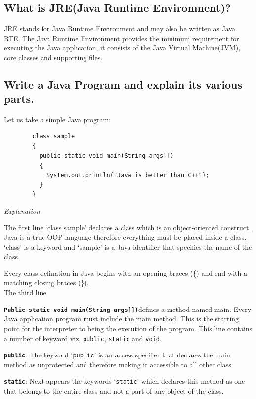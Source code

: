 \documentclass[11pt, a4paper]{book}
\begin{document}
    \subsection{What is JRE(Java Runtime Environment)?}
      JRE stands for Java Runtime Environment and may also be written as Java RTE. The Java Runtime Environment provides the minimum requirement for executing the Java application, it consists of the Java Virtual Machine(JVM), core classes and supporting files.
    
    
    \subsection{Write a Java Program and explain its various parts.}
      Let us take a simple Java program:
    
      \begin{lstlisting}
        class sample
        {
          public static void main(String args[])
          {
            System.out.println("Java is better than C++");
          }
        }
      \end{lstlisting}
      \textit{Explanation}
  
      The first line `class sample' declares a class which is an object-oriented construct. Java is a true OOP language therefore everything must be placed inside a class. `class' is a keyword and `sample' is a Java identifier that specifies the name of the class.
      
      Every class defination in Java begins with an opening braces (\{) and end with a matching closing braces (\}).
      \ \\
      
      The third line
      
      \large \texttt{\textbf{Public static void main(String args[])}}\normalsize defines a method named main. Every Java application program must include the main method. This is the starting point for the interpreter to being the execution of the program. This line contains a number of keyword viz,
      \texttt{public}, \texttt{static} and \texttt{void}.
      
      \large \texttt{\textbf{public}}\normalsize: The keyword `\texttt{public}' is an access specifier that declares the main method as unprotected and therefore making it accessible to all other class.
      
      \large \texttt{\textbf{static}}\normalsize: Next appears the keywords `\texttt{static}' which declares this method as one that belongs to the entire class and not a part of any object of the class.
      
\end{document}

